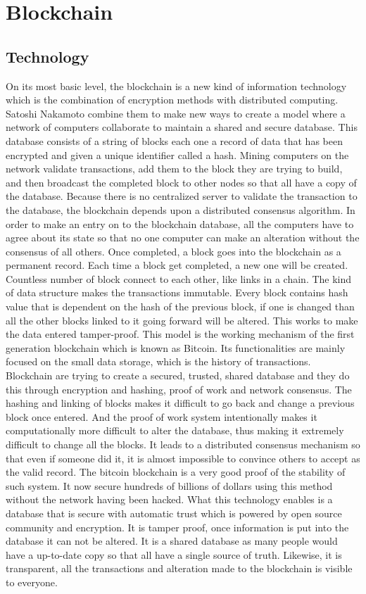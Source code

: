 \documentclass{ecsthesis}      %
\begin{document}
\section{Blockchain}
\subsection{Technology}
On its most basic level, 
the blockchain is a new kind of information technology 
which is the combination of encryption methods with distributed computing.
Satoshi Nakamoto \cite{nakamoto2008bitcoin} combine them to make new ways to create a model 
where a network of computers collaborate to maintain a shared and secure database. 
This database consists of a string of blocks each one a record of data 
that has been encrypted and given a unique identifier called a hash.
Mining computers on the network validate transactions, 
add them to the block they are trying to build, 
and then broadcast the completed block to other nodes 
so that all have a copy of the database. 
Because there is no centralized server to validate the transaction to the database,
the blockchain depends upon a distributed consensus algorithm. 
In order to make an entry on to the blockchain database, 
all the computers have to agree about its state 
so that no one computer can make an alteration without the consensus of all others.
Once completed, a block goes into the blockchain as a permanent record. Each time a block get completed, a new one will be created.
Countless number of block connect to each other, like links in a chain. The kind of data structure makes the transactions immutable.
Every block contains hash value that is dependent on the hash of the previous block, 
if one is changed than all the other blocks linked to it going forward will be altered.
This works to make the data entered tamper-proof. 
This model is the working mechanism of the first generation blockchain which is known as Bitcoin.
Its functionalities are mainly focused on the small data storage, which is the history of transactions.
Blockchain are trying to create a secured, trusted, 
shared database and they do this through encryption and hashing,
proof of work and network consensus. The hashing and linking of blocks 
makes it difficult to go back and change a previous block once entered. 
And the proof of work system intentionally makes it computationally more difficult to alter the database,
thus making it extremely difficult to change all the blocks. It leads to a distributed consensus mechanism so that even if someone did it,
it is almost impossible to convince others to accept as the valid record. The bitcoin blockchain is a very good proof of the stability of such system.
It now secure hundreds of billions of dollars using this method without the network having been hacked. 
What this technology enables is a database that is secure with automatic trust 
which is powered by open source community and encryption.
It is tamper proof, once information is put into the database it can not be altered. 
It is a shared database as many people would have a up-to-date copy so that all have a single source of truth.
Likewise, it is transparent, all the transactions and alteration made to the blockchain is visible to everyone.
\end{document}
